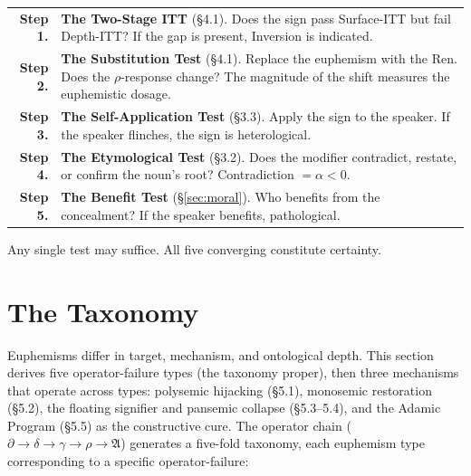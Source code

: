 \documentclass[11pt, oneside]{article}
\theoremstyle{definition}
\begin{document}
{\small
\noindent\begin{tabular}{r p{}}
\textbf{Step 1.} & \textbf{The Two-Stage ITT} (\S4.1). Does the sign pass Surface-ITT but fail Depth-ITT? If the gap is present, Inversion is indicated. \\[0.3em]
\textbf{Step 2.} & \textbf{The Substitution Test} (\S4.1). Replace the euphemism with the Ren. Does the $\rho$-response change? The magnitude of the shift measures the euphemistic dosage. \\[0.3em]
\textbf{Step 3.} & \textbf{The Self-Application Test} (\S3.3). Apply the sign to the speaker. If the speaker flinches, the sign is heterological. \\[0.3em]
\textbf{Step 4.} & \textbf{The Etymological Test} (\S3.2). Does the modifier contradict, restate, or confirm the noun's root? Contradiction $= \alpha < 0$. \\[0.3em]
\textbf{Step 5.} & \textbf{The Benefit Test} (\S\ref{sec:moral}). Who benefits from the concealment? If the speaker benefits, pathological. \\[0.3em]
\end{tabular}
}

Any single test may suffice. All five converging constitute certainty.

\section{The Taxonomy}

Euphemisms differ in target, mechanism, and ontological depth. This section derives five operator-failure types (the taxonomy proper), then three mechanisms that operate across types: polysemic hijacking (\S5.1), monosemic restoration (\S5.2), the floating signifier and pansemic collapse (\S5.3--5.4), and the Adamic Program (\S5.5) as the constructive cure. The operator chain ($\partial \to \delta \to \gamma \to \rho \to \mathfrak{A}$) generates a five-fold taxonomy, each euphemism type corresponding to a specific operator-failure:
\end{document}
